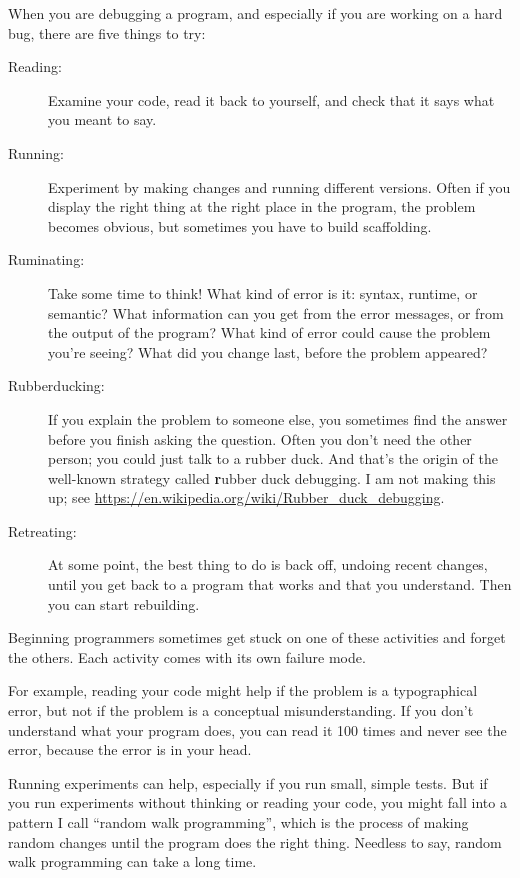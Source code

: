 \documentclass[
DIV=11,
fontsize=12,
twoside,
headinclude=false,
titlepage=firstiscover,
abstract=true,
headsepline=true,
footsepline=true,
chapterprefix=true, %
headings=big,
bibliography=totoc,%
captions=tableheading
]{scrbook}
\theoremstyle{definition}
\begin{document}
When you are debugging a program, and especially if you are
working on a hard bug, there are five things to try:

\begin{description}

\item[Reading:] Examine your code, read it back to yourself, and
check that it says what you meant to say.

\item[Running:] Experiment by making changes and running different
versions.  Often if you display the right thing at the right place
in the program, the problem becomes obvious, but sometimes you have to
build scaffolding.

\item[Ruminating:] Take some time to think!  What kind of error
is it: syntax, runtime, or semantic?  What information can you get from
the error messages, or from the output of the program?  What kind of
error could cause the problem you're seeing?  What did you change
last, before the problem appeared?

\item[Rubberducking:] If you explain the problem to someone else, you
  sometimes find the answer before you finish asking the question.
  Often you don't need the other person; you could just talk to a rubber
  duck.  And that's the origin of the well-known strategy called {\textbf
    rubber duck debugging}.  I am not making this up; see
  \url{https://en.wikipedia.org/wiki/Rubber_duck_debugging}.

\item[Retreating:] At some point, the best thing to do is back
off, undoing recent changes, until you get back to a program that
works and that you understand.  Then you can start rebuilding.

\end{description}

Beginning programmers sometimes get stuck on one of these activities
and forget the others.  Each activity comes with its own failure
mode.

For example, reading your code might help if the problem is a
typographical error, but not if the problem is a conceptual
misunderstanding.  If you don't understand what your program does, you
can read it 100 times and never see the error, because the error is in
your head.

Running experiments can help, especially if you run small, simple
tests.  But if you run experiments without thinking or reading your
code, you might fall into a pattern I call ``random walk programming'',
which is the process of making random changes until the program
does the right thing.  Needless to say, random walk programming
can take a long time.
\end{document}
